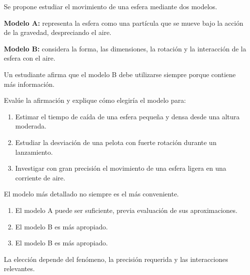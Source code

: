 \begin{ejercicio}
Se propone estudiar el movimiento de una esfera mediante dos modelos.

\textbf{Modelo A:} representa la esfera como una partícula que se mueve bajo la acción de la gravedad, despreciando el aire.

\textbf{Modelo B:} considera la forma, las dimensiones, la rotación y la interacción de la esfera con el aire.

Un estudiante afirma que el modelo B debe utilizarse siempre porque contiene más información.

Evalúe la afirmación y explique cómo elegiría el modelo para:

\begin{enumerate}[label=\alph*)]
    \item Estimar el tiempo de caída de una esfera pequeña y densa desde una altura moderada.
    \item Estudiar la desviación de una pelota con fuerte rotación durante un lanzamiento.
    \item Investigar con gran precisión el movimiento de una esfera ligera en una corriente de aire.
\end{enumerate}
\end{ejercicio}

\begin{respuesta}
El modelo más detallado no siempre es el más conveniente.

\begin{enumerate}[label=\alph*)]
    \item El modelo A puede ser suficiente, previa evaluación de sus aproximaciones.
    \item El modelo B es más apropiado.
    \item El modelo B es más apropiado.
\end{enumerate}

La elección depende del fenómeno, la precisión requerida y las interacciones relevantes.
\end{respuesta}

